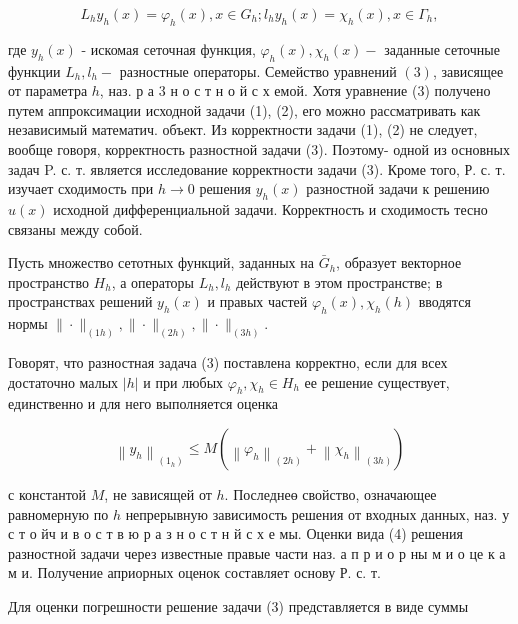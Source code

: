\documentclass[10pt]{article}
\begin{document}
\[

L_{h} y_{h}(x)=\varphi_{h}(x), x \in G_{h} ; l_{h} y_{h}(x)=\chi_{h}(x), x \in \Gamma_{h},

\]



где $y_{h}(x)$ - искомая сеточная функция, $\varphi_{h}(x), \chi_{h}(x)-$ заданные сеточные функции $L_{h}, l_{h}-$ разностные операторы. Семейство уравнений $(3)$, зависящее от параметра $h$, наз. р а 3 н о с т н о й с х емой. Хотя уравнение (3) получено путем аппроксимации исходной задачи (1), (2), его можно рассматривать как независимый математич. объект. Из корректности задачи (1), (2) не следует, вообще говоря, корректность разностной задачи (3). Поэтому- одной из основных задач P. с. т. является исследование корректности задачи (3). Кроме того, Р. с. т. изучает сходимость при $h \rightarrow 0$ решения $y_{h}(x)$ разностной задачи к решению $u(x)$ исходной дифференциальной задачи. Корректность и сходимость тесно связаны между собой.



Пусть множество сетотных функций, заданных на $\bar{G}_{h}$, образует векторное пространство $H_{h}$, а операторы $L_{h}, l_{h}$ действуют в этом пространстве; в пространствах решений $y_{h}(x)$ и правых частей $\varphi_{h}(x), \chi_{h}(h)$ вводятся нормы $\|\cdot\|_{(1 h)},\|\cdot\|_{(2 h)},\|\cdot\|_{(3 h)}$.



Говорят, что разностная задача (3) поставлена корректно, если для всех достаточно малых $|h|$ и при любых $\varphi_{h}, \chi_{h} \in H_{h}$ ее решение существует, единственно и для него выполняется оценка



\[

\left\|y_{h}\right\|_{\left(1_{h}\right)} \leqslant M\left(\left\|\varphi_{h}\right\|_{(2 h)}+\left\|\chi_{h}\right\|_{(3 h)}\right)

\]



с константой $M$, не зависящей от $h$. Последнеө свойство, означающее равномерную по $h$ непрерывную зависимость решения от входных данных, наз. у с т о йч и в о с т в ю р а з н о с т н й с х е мы. Оценки вида (4) решения разностной задачи через известные правые части наз. а п р и о р ны м и о це к а м и. Получение априорных оценок составляет основу Р. с. т.



Для оценки погрешности решение задачи (3) представляется в виде суммы
\end{document}
